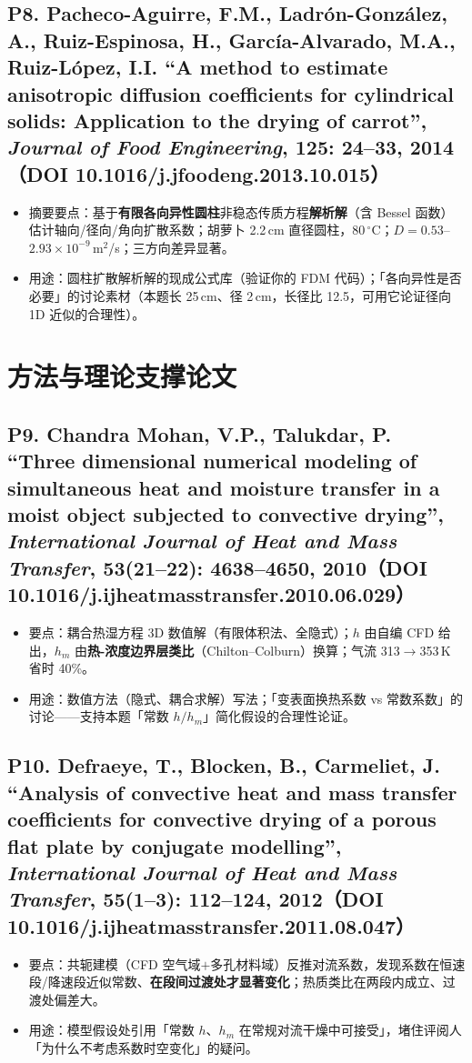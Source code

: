 \documentclass[12pt,a4paper]{ctexart}
\begin{document}
\subsection{P8. Pacheco-Aguirre, F.M., Ladr\'on-Gonz\'alez, A., Ruiz-Espinosa, H., Garc\'ia-Alvarado, M.A., Ruiz-L\'opez, I.I. ``A method to estimate anisotropic diffusion coefficients for cylindrical solids: Application to the drying of carrot'', \textit{Journal of Food Engineering}, 125: 24--33, 2014（DOI 10.1016/j.jfoodeng.2013.10.015）\quad [摘要已核]}
\begin{itemize}
\item 摘要要点：基于\textbf{有限各向异性圆柱}非稳态传质方程\textbf{解析解}（含 Bessel 函数）估计轴向/径向/角向扩散系数；胡萝卜 2.2\,cm 直径圆柱，80\,$^\circ$C；$D=0.53$--$2.93\times10^{-9}$\,m$^2$/s；三方向差异显著。
\item 用途：圆柱扩散解析解的现成公式库（验证你的 FDM 代码）；「各向异性是否必要」的讨论素材（本题长 25\,cm、径 2\,cm，长径比 12.5，可用它论证径向 1D 近似的合理性）。
\end{itemize}

\section{方法与理论支撑论文}

\subsection{P9. Chandra Mohan, V.P., Talukdar, P. ``Three dimensional numerical modeling of simultaneous heat and moisture transfer in a moist object subjected to convective drying'', \textit{International Journal of Heat and Mass Transfer}, 53(21--22): 4638--4650, 2010（DOI 10.1016/j.ijheatmasstransfer.2010.06.029）\quad [摘要已核]}
\begin{itemize}
\item 要点：耦合热湿方程 3D 数值解（有限体积法、全隐式）；$h$ 由自编 CFD 给出，$h_m$ 由\textbf{热-浓度边界层类比}（Chilton--Colburn）换算；气流 313$\to$353\,K 省时 40\%。
\item 用途：数值方法（隐式、耦合求解）写法；「变表面换热系数 vs 常数系数」的讨论——支持本题「常数 $h/h_m$」简化假设的合理性论证。
\end{itemize}

\subsection{P10. Defraeye, T., Blocken, B., Carmeliet, J. ``Analysis of convective heat and mass transfer coefficients for convective drying of a porous flat plate by conjugate modelling'', \textit{International Journal of Heat and Mass Transfer}, 55(1--3): 112--124, 2012（DOI 10.1016/j.ijheatmasstransfer.2011.08.047）\quad [摘要已核]}
\begin{itemize}
\item 要点：共轭建模（CFD 空气域$+$多孔材料域）反推对流系数，发现系数在恒速段/降速段近似常数、\textbf{在段间过渡处才显著变化}；热质类比在两段内成立、过渡处偏差大。
\item 用途：模型假设处引用「常数 $h$、$h_m$ 在常规对流干燥中可接受」，堵住评阅人「为什么不考虑系数时空变化」的疑问。
\end{itemize}
\end{document}
